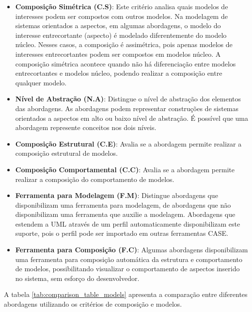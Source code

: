 \begin{itemize}
	\item \textbf{Composição Simétrica (C.S)}: Este critério analisa quais modelos de interesses podem ser compostos com outros modelos. Na modelagem de
	sistemas orientados a aspectos, em algumas abordagens, o modelo do interesse entrecortante (aspecto) é modelado diferentemente do modelo núcleo.
	Nesses casos, a composição é assimétrica, pois apenas modelos de interesses entrecortantes podem ser compostos em modelos núcleo. A composição
	simétrica acontece quando não há diferenciação entre modelos entrecortantes e modelos núcleo, podendo realizar a composição entre qualquer modelo.
	\item \textbf{Nível de Abstração (N.A)}: Distingue o nível de abstração dos elementos das abordagens. As abordagens podem representar construções de
	sistemas orientados a aspectos em alto ou baixo nível de abstração. É possível que uma abordagem represente conceitos nos dois níveis.
	\item \textbf{Composição Estrutural (C.E)}: Avalia se a abordagem permite realizar a composição estrutural de modelos.
	\item \textbf{Composição Comportamental (C.C)}: Avalia se a abordagem permite realizar a composição do comportamento de modelos.
	\item \textbf{Ferramenta para Modelagem (F.M)}: Distingue abordagens que disponibilizam uma ferramenta para modelagem, de abordagens que não
	disponibilizam uma ferramenta que auxilie a modelagem. Abordagens que estendem a UML através de um perfil automaticamente disponibilizam este suporte, pois o perfil
	pode ser importado em outras ferramentas CASE.
	\item \textbf{Ferramenta para Composição (F.C)}: Algumas abordagens disponibilizam uma ferramenta para composição automática da estrutura e
	comportamento de modelos, possibilitando visualizar o comportamento de aspectos inserido no sistema, sem esforço do desenvolvedor. 
\end{itemize}

A tabela \ref{tab:comparison_table_models} apresenta a comparação entre diferentes abordagens utilizando os critérios de composição e modelos.

